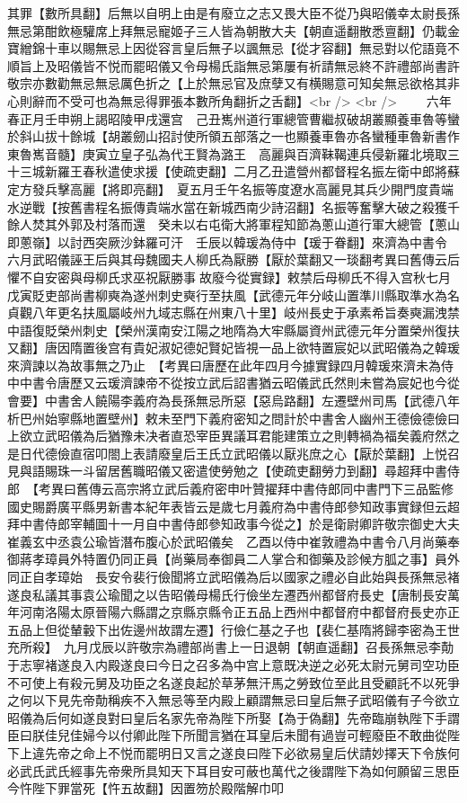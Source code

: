 其罪【數所具翻】后無以自明上由是有廢立之志又畏大臣不從乃與昭儀幸太尉長孫無忌第酣飲極驩席上拜無忌寵姬子三人皆為朝散大夫【朝直遥翻散悉亶翻】仍載金寶繒錦十車以賜無忌上因從容言皇后無子以諷無忌【從才容翻】無忌對以佗語竟不順旨上及昭儀皆不悦而罷昭儀又令母楊氏詣無忌第屢有祈請無忌終不許禮部尚書許敬宗亦數勸無忌無忌厲色折之【上於無忌官及庶孽又有横賜意可知矣無忌欲格其非心則辭而不受可也為無忌得罪張本數所角翻折之舌翻】<br />
<br />
　　六年春正月壬申朔上謁昭陵甲戌還宫　己丑嶲州道行軍總管曹繼叔破胡叢顯養車魯等蠻於斜山拔十餘城【胡叢劒山招討使所領五部落之一也顯養車魯亦各蠻種車魯新書作東魯嶲音髓】庚寅立皇子弘為代王賢為潞王　高麗與百濟靺鞨連兵侵新羅北境取三十三城新羅王春秋遣使求援【使疏吏翻】二月乙丑遣營州都督程名振左衛中郎將蘇定方發兵擊高麗【將即亮翻】　夏五月壬午名振等度遼水高麗見其兵少開門度貴端水逆戰【按舊書程名振傳貴端水當在新城西南少詩沼翻】名振等奮擊大破之殺獲千餘人焚其外郭及村落而還　癸未以右屯衛大將軍程知節為蔥山道行軍大總管【蔥山即蔥嶺】以討西突厥沙鉢羅可汗　壬辰以韓瑗為侍中【瑗于眷翻】來濟為中書令　六月武昭儀誣王后與其母魏國夫人柳氏為厭勝【厭於葉翻又一琰翻考異曰舊傳云后懼不自安密與母柳氏求巫祝厭勝事故廢今從實録】敕禁后母柳氏不得入宫秋七月戊寅貶吏部尚書柳奭為遂州刺史奭行至扶風【武德元年分岐山置準川縣取準水為名貞觀八年更名扶風屬岐州九域志縣在州東八十里】岐州長史于承素希旨奏奭漏洩禁中語復貶榮州刺史【榮州漢南安江陽之地隋為大牢縣屬資州武德元年分置榮州復扶又翻】唐因隋置後宫有貴妃淑妃德妃賢妃皆視一品上欲特置宸妃以武昭儀為之韓瑗來濟諫以為故事無之乃止　【考異曰唐歷在此年四月今據實録四月韓瑗來濟未為侍中中書令唐歷又云瑗濟諫帝不從按立武后詔書猶云昭儀武氏然則未嘗為宸妃也今從會要】中書舍人饒陽李義府為長孫無忌所惡【惡烏路翻】左遷壁州司馬【武德八年析巴州始寧縣地置壁州】敕未至門下義府密知之問計於中書舍人幽州王德儉德儉曰上欲立武昭儀為后猶豫未决者直恐宰臣異議耳君能建策立之則轉禍為福矣義府然之是日代德儉直宿叩閤上表請廢皇后王氏立武昭儀以厭兆庶之心【厭於葉翻】上悦召見與語賜珠一斗留居舊職昭儀又密遣使勞勉之【使疏吏翻勞力到翻】尋超拜中書侍郎　【考異曰舊傳云高宗將立武后義府密申叶贊擢拜中書侍郎同中書門下三品監修國史賜爵廣平縣男新書本紀年表皆云是歲七月義府為中書侍郎參知政事實録但云超拜中書侍郎宰輔圖十一月自中書侍郎參知政事今從之】於是衛尉卿許敬宗御史大夫崔義玄中丞袁公瑜皆潛布腹心於武昭儀矣　乙酉以侍中崔敦禮為中書令八月尚藥奉御蔣孝璋員外特置仍同正員【尚藥局奉御員二人掌合和御藥及診候方胍之事】員外同正自孝璋始　長安令裴行儉聞將立武昭儀為后以國家之禮必自此始與長孫無忌褚遂良私議其事袁公瑜聞之以告昭儀母楊氏行儉坐左遷西州都督府長史【唐制長安萬年河南洛陽太原晉陽六縣謂之京縣京縣令正五品上西州中都督府中都督府長史亦正五品上但從輦轂下出佐邊州故謂左遷】行儉仁基之子也【裴仁基隋將歸李密為王世充所殺】　九月戊辰以許敬宗為禮部尚書上一日退朝【朝直遥翻】召長孫無忌李勣于志寧褚遂良入内殿遂良曰今日之召多為中宫上意既决逆之必死太尉元舅司空功臣不可使上有殺元舅及功臣之名遂良起於草茅無汗馬之勞致位至此且受顧託不以死爭之何以下見先帝勣稱疾不入無忌等至内殿上顧謂無忌曰皇后無子武昭儀有子今欲立昭儀為后何如遂良對曰皇后名家先帝為陛下所娶【為于偽翻】先帝臨崩執陛下手謂臣曰朕佳兒佳婦今以付卿此陛下所聞言猶在耳皇后未聞有過豈可輕廢臣不敢曲從陛下上違先帝之命上不悦而罷明日又言之遂良曰陛下必欲易皇后伏請妙擇天下令族何必武氏武氏經事先帝衆所具知天下耳目安可蔽也萬代之後謂陛下為如何願留三思臣今忤陛下罪當死【忤五故翻】因置笏於殿階解巾叩